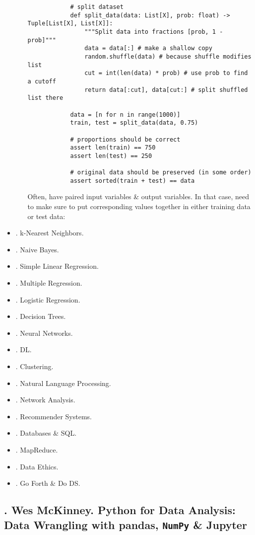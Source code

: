 \documentclass{article}
\begin{document}
\begin{itemize}
\begin{itemize}
\begin{verbatim}
			# split dataset
			def split_data(data: List[X], prob: float) -> Tuple[List[X], List[X]]:
			    """Split data into fractions [prob, 1 - prob]"""
			    data = data[:] # make a shallow copy
			    random.shuffle(data) # because shuffle modifies list
			    cut = int(len(data) * prob) # use prob to find a cutoff
			    return data[:cut], data[cut:] # split shuffled list there
			
			data = [n for n in range(1000)]
			train, test = split_data(data, 0.75)
			
			# proportions should be correct
			assert len(train) == 750
			assert len(test) == 250
			
			# original data should be preserved (in some order)
			assert sorted(train + test) == data
		\end{verbatim}
		Often, have paired input variables \& output variables. In that case, need to make sure to put corresponding values together in either training data or test data:
	\end{itemize}
	\item {. k-Nearest Neighbors.}
	\item {. Naive Bayes.}
	\item {. Simple Linear Regression.}
	\item {. Multiple Regression.}
	\item {. Logistic Regression.}
	\item {. Decision Trees.}
	\item {. Neural Networks.}
	\item {. DL.}
	\item {. Clustering.}
	\item {. Natural Language Processing.}
	\item {. Network Analysis.}
	\item {. Recommender Systems.}
	\item {. Databases \& SQL.}
	\item {. MapReduce.}
	\item {. Data Ethics.}
	\item {. Go Forth \& Do DS.}
\end{itemize}


\subsection{\cite{McKinney2022}. {\sc Wes McKinney}. Python for Data Analysis: Data Wrangling with pandas, {\tt NumPy} \& Jupyter}
{}
\end{document}
